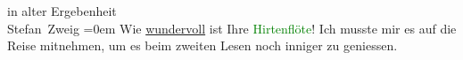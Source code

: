 \pstart
           in alter Ergebenheit{\\[\baselineskip]}\spacefill\mbox{Stefan Zweig}\pend
           \leftskip=0em{}
\pstart
           \noindent{}Wie \uline{wundervoll} ist Ihre \textcolor{green}{Hirtenflöte}{}\ledrightnote{\textcolor{green}{Die Hirtenflöte. Novelle}}! Ich musste mir {\pb}es auf die Reise mitnehmen, um es beim zweiten Lesen noch inniger zu
                  geniessen.\pend
           \endnumbering{}
\begin{anhang}
\end{anhang}
      